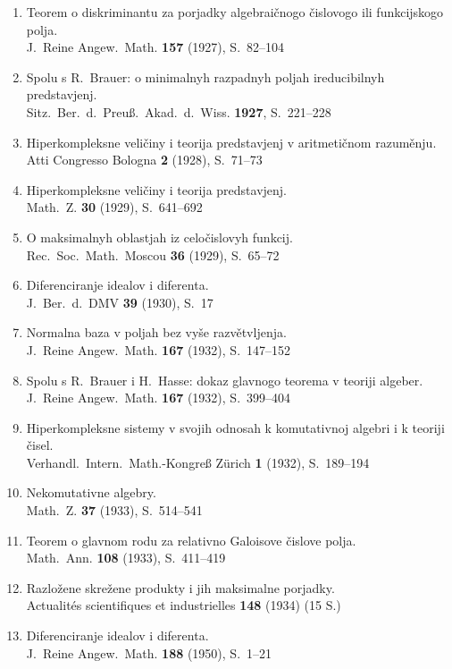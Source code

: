 \documentclass[11pt]{article}
\newcommand{\foreign}[1]{#1}
\begin{document}
\begin{enumerate}[label={\small\arabic*.},leftmargin=2em,itemsep=0.3em]
\item Teorem o diskriminantu za porjadky algebraičnogo čislovogo ili funkcijskogo polja.\\
\foreign{J.\ Reine Angew.\ Math.} \textbf{157} (1927), S.~82--104

\item Spolu s R.\ Brauer: o minimalnyh razpadnyh poljah ireducibilnyh predstavjenj.\\
\foreign{Sitz.\ Ber.\ d.\ Preuß.\ Akad.\ d.\ Wiss.} \textbf{1927}, S.~221--228

\item Hiperkompleksne veličiny i teorija predstavjenj v aritmetičnom razuměnju.\\
\foreign{Atti Congresso Bologna} \textbf{2} (1928), S.~71--73

\item Hiperkompleksne veličiny i teorija predstavjenj.\\
\foreign{Math.\ Z.} \textbf{30} (1929), S.~641--692

\item O maksimalnyh oblastjah iz celočislovyh funkcij.\\
\foreign{Rec.\ Soc.\ Math.\ Moscou} \textbf{36} (1929), S.~65--72

\item Diferenciranje idealov i diferenta.\\
\foreign{J.\ Ber.\ d.\ DMV} \textbf{39} (1930), S.~17

\item Normalna baza v poljah bez vyše razvětvljenja.\\
\foreign{J.\ Reine Angew.\ Math.} \textbf{167} (1932), S.~147--152

\item Spolu s R.\ Brauer i H.\ Hasse: dokaz glavnogo teorema v teoriji algeber.\\
\foreign{J.\ Reine Angew.\ Math.} \textbf{167} (1932), S.~399--404

\item Hiperkompleksne sistemy v svojih odnosah k komutativnoj algebri i k teoriji čisel.\\
\foreign{Verhandl.\ Intern.\ Math.-Kongreß Zürich} \textbf{1} (1932), S.~189--194

\item Nekomutativne algebry.\\
\foreign{Math.\ Z.} \textbf{37} (1933), S.~514--541

\item Teorem o glavnom rodu za relativno Galoisove čislove polja.\\
\foreign{Math.\ Ann.} \textbf{108} (1933), S.~411--419

\item Razložene skrežene produkty i jih maksimalne porjadky.\\
\foreign{Actualités scientifiques et industrielles} \textbf{148} (1934) (15 S.)

\item Diferenciranje idealov i diferenta.\\
\foreign{J.\ Reine Angew.\ Math.} \textbf{188} (1950), S.~1--21
\end{enumerate}
\end{document}
